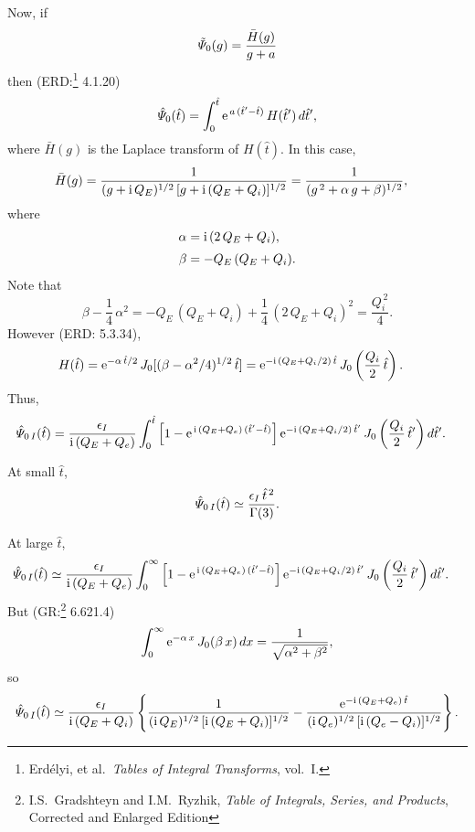\documentclass[titlepage=false,12pt]{article}
\begin{document}
Now, if
\begin{equation}
\tilde{\mit\Psi}_0(g) = \frac{\bar{H}(g)}{g + a}
\end{equation}
then (ERD:\footnote{Erd\'{e}lyi, et al.\ {\em Tables of Integral Transforms}, vol.~I.}
 4.1.20)\begin{equation}
\hat{\mit\Psi}_0(\hat{t}) = \int_0^{\hat{t}}{\rm e}^{\,a\,(\hat{t}'-\hat{t})}\,H(\hat{t}')\,d\hat{t}',
\end{equation}
where $\bar{H}(g)$ is the Laplace transform of $H(\hat{t})$. 
In this case,
\begin{align}
\bar{H}(g) &= \frac{1}{(g+{\rm i}\,Q_E)^{1/2}\,[g +{\rm i}\,(Q_E+Q_i)]^{1/2}}=\frac{1}{(g^{\,2}  + \alpha\,g + \beta)^{1/2}},
\end{align}
where
\begin{align}
\alpha &= {\rm i}\,(2\,Q_E+Q_i),\\[0.5ex]
\beta&= - Q_E\,(Q_E+Q_i).
\end{align}
Note that
\begin{equation}
\beta- \frac{1}{4}\,\alpha^2 = -Q_E\,(Q_E+Q_i) +\frac{1}{4}\,(2\,Q_E+Q_i)^2 = \frac{Q_i^{\,2}}{4}.
\end{equation}
However (ERD: 5.3.34), 
\begin{align}
H(\hat{t}) &= {\rm e}^{-\alpha\,\hat{t}/2}\,J_0[(\beta-\alpha^2/4)^{1/2}\,\hat{t}]= {\rm e}^{-{\rm i}\,(Q_E+Q_i/2)\,\hat{t}}\,J_0\left(\frac{Q_i}{2}\,\hat{t}\right).
\end{align}
Thus,
\begin{align}
\hat{\mit\Psi}_{0\,I}(\hat{t}) &=\frac{\epsilon_I}{{\rm i}\,(Q_E+Q_e)}
\int_0^{\hat{t}}\left[1-{\rm e}^{\,{\rm i}\,(Q_E+Q_e)\,(\hat{t}'-\hat{t})}\right]
{\rm e}^{-{\rm i}\,(Q_E+Q_i/2)\,\hat{t}'}\,J_0\left(\frac{Q_i}{2}\,\hat{t}'\right)d\hat{t}'.
\end{align}

At small $\hat{t}$,
\begin{equation}
\hat{\mit\Psi}_{0\,I}(\hat{t})\simeq \frac{\epsilon_I\,\hat{t}^{\,2}}{\Gamma(3)}.
\end{equation}

At large $\hat{t}$,
\begin{align}
\hat{\mit\Psi}_{0\,I}(\hat{t}) &\simeq \frac{\epsilon_I}{{\rm i}\,(Q_E+Q_e)}
\int_0^{\infty}\left[1-{\rm e}^{\,{\rm i}\,(Q_E+Q_e)\,(\hat{t}'-\hat{t})}\right]
{\rm e}^{-{\rm i}\,(Q_E+Q_i/2)\,\hat{t}'}\,J_0\left(\frac{Q_i}{2}\,\hat{t}'\right)d\hat{t}'.
\end{align}
But (GR:\footnote{I.S.~Gradshteyn and I.M.~Ryzhik, {\em Table of Integrals, Series, and Products}, Corrected and Enlarged Edition} 6.621.4)
\begin{equation}
\int_0^\infty {\rm e}^{-\alpha\,x}\,J_0(\beta\,x)\,dx =\frac{1}{\sqrt{\alpha^2+\beta^2}},
\end{equation}
so
\begin{equation}
\hat{\mit\Psi}_{0\,I}(\hat{t})\simeq \frac{\epsilon_I}{{\rm i}\,(Q_E+Q_i)}\left\{
\frac{1}{({\rm i}\,Q_E)^{1/2}\,[{\rm i}\,(Q_E+Q_i)]^{1/2}}- \frac{{\rm e}^{-{\rm i}\,(Q_E+Q_e)\,\hat{t}}}{({\rm i}\,Q_e)^{1/2}\,[{\rm i}\,(Q_e-Q_i)]^{1/2}}\right\}.
\end{equation}
\end{document}
